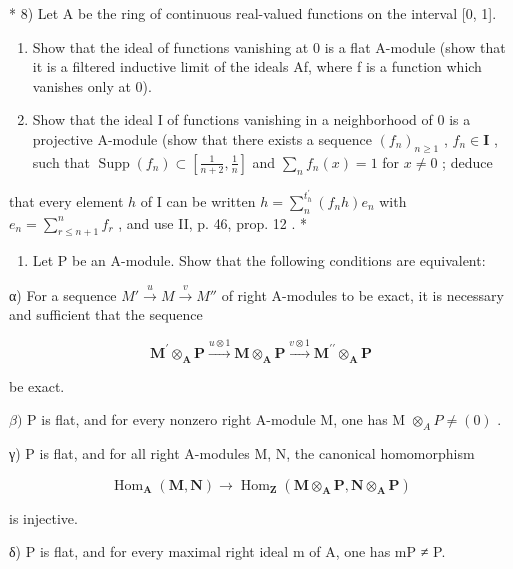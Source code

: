 * 8) Let A be the ring of continuous real-valued functions on the interval {[}0, 1{]}.

\begin{enumerate}
\def\labelenumi{\alph{enumi})}
\item
  Show that the ideal of functions vanishing at 0 is a flat A-module (show that it is a filtered inductive limit of the ideals Af, where f is a function which vanishes only at 0).
\item
  Show that the ideal I of functions vanishing in a neighborhood of 0 is a projective A-module (show that there exists a sequence \((f_n)_{n\geqslant 1}\) , \(f_n\in \mathbf{I}\) , such that \(\operatorname {Supp}(f_n)\subset \left[\frac{1}{n + 2},\frac{1}{n}\right]\) and \(\sum_{n}f_{n}(x) = 1\) for \(x\neq 0\) ; deduce
\end{enumerate}

that every element \(h\) of I can be written \(h = \sum_{n}^{t_{h}^{\prime}} (f_n h) e_n\) with \(e_n = \sum_{r \leqslant n+1}^{n} f_r\) , and use II, p. 46, prop. 12 . *

\begin{enumerate}
\def\labelenumi{\arabic{enumi})}
\setcounter{enumi}{8}
\tightlist
\item
  Let P be an A-module. Show that the following conditions are equivalent:
\end{enumerate}

α) For a sequence \(M' \xrightarrow{u} M \xrightarrow{v} M''\) of right A-modules to be exact, it is necessary and sufficient that the sequence

\[
\mathbf {M} ^ {\prime} \otimes_ {\mathbf {A}} \mathbf {P} \xrightarrow {u \otimes 1} \mathbf {M} \otimes_ {\mathbf {A}} \mathbf {P} \xrightarrow {v \otimes 1} \mathbf {M} ^ {\prime \prime} \otimes_ {\mathbf {A}} \mathbf {P}
\]

be exact.

\(\beta)\) P is flat, and for every nonzero right A-module M, one has M \(\otimes_{A} P \neq (0)\) .

γ) P is flat, and for all right A-modules M, N, the canonical homomorphism

\[
\operatorname{Hom} _ {\mathbf {A}} (\mathbf {M}, \mathbf {N}) \rightarrow \operatorname{Hom} _ {\mathbf {Z}} (\mathbf {M} \otimes_ {\mathbf {A}} \mathbf {P}, \mathbf {N} \otimes_ {\mathbf {A}} \mathbf {P})
\]

is injective.

δ) P is flat, and for every maximal right ideal m of A, one has mP ≠ P.

